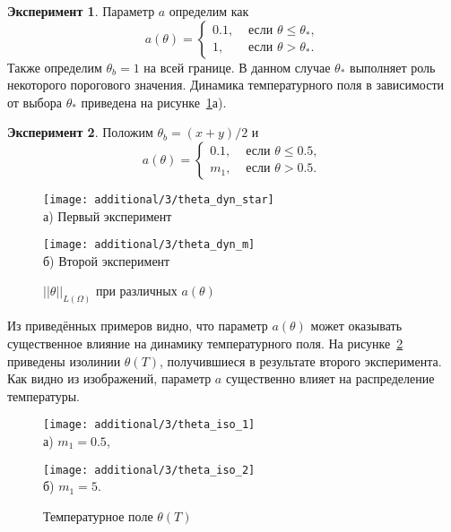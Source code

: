\textbf{Эксперимент 1}.
Параметр $a$ определим как
\[
    a(\theta)=
    \begin{cases}
        0.1, & \text { если } \theta \leq \theta_{*}, \\
        1, & \text { если } \theta>\theta_{*}.
    \end{cases}
\]
Также определим $\theta_b = 1$ на всей границе.
В данном случае $\theta_{*}$ выполняет роль некоторого порогового значения.
Динамика температурного поля в зависимости от выбора $\theta_*$ приведена на рисунке~\ref{fig:4_3:theta_dyn_diff}а).


\textbf{Эксперимент 2}.
Положим $\theta_b = (x + y) /2$ и
\[
    a(\theta)=
    \begin{cases}
        0.1, & \text { если } \theta \leq 0.5, \\
        m_1, & \text { если } \theta > 0.5.
    \end{cases}
\]

\begin{figure}[h!t]
    \begin{minipage}[b][][b]{0.49\linewidth}
        \centering
        \texttt{[image: additional/3/theta\_dyn\_star]} \\ а) Первый эксперимент
    \end{minipage}
    \hfill
    \begin{minipage}[b][][b]{0.49\linewidth}
        \centering
        \texttt{[image: additional/3/theta\_dyn\_m]} \\ б) Второй эксперимент
    \end{minipage}
    \caption{$||\theta||_{L(\Omega)}$ при различных $a(\theta)$}
    \label{fig:4_3:theta_dyn_diff}
\end{figure}

Из приведённых примеров видно, что параметр $a(\theta)$ может оказывать существенное влияние
на динамику температурного поля.
На рисунке~\ref{fig:4_3:theta_iso_2exp} приведены изолинии $\theta(T)$,
получившиеся в результате второго эксперимента.
Как видно из изображений, параметр $a$ существенно влияет на распределение температуры.
\begin{figure}[h!t]
    \begin{minipage}[b][][b]{0.49\linewidth}
        \centering
        \texttt{[image: additional/3/theta\_iso\_1]} \\ а) $m_1 = 0.5$,
    \end{minipage}
    \hfill
    \begin{minipage}[b][][b]{0.49\linewidth}
        \centering
        \texttt{[image: additional/3/theta\_iso\_2]} \\ б) $m_1 = 5$.
    \end{minipage}
    \caption{Температурное поле $\theta (T)$}
    \label{fig:4_3:theta_iso_2exp}
\end{figure}


